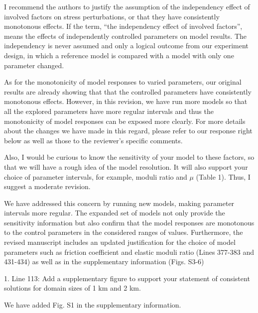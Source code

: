 \documentclass[12pt]{article}
\begin{document}
\begin{response}{I recommend the authors to justify the assumption of the independency effect of involved factors on stress perturbations, or that they have consistently monotonous effects.}
    If the term, ``the independency effect of involved factors'', means the effects of independently controlled parameters on model results. The independency is never assumed and only a logical outcome from our experiment design, in which a reference model is compared with a model with only one parameter changed. 

As for the monotonicity of model responses to varied parameters, our original results are already showing that that the controlled parameters have consistently monotonous effects. However, in this revision, we have run more models so that all the explored parameters have more regular intervals and thus the monotonicity of model responses can be exposed more clearly. For more details about the changes we have made in this regard, please refer to our response right below as well as those to the reviewer's specific comments.
\end{response}

\begin{response}{Also, I would be curious to know the sensitivity of your model to these factors, so that we will have a rough idea of the model resolution. It will also support your choice of parameter intervals, for example, moduli ratio and $\mu$ (Table 1). Thus, I suggest a moderate revision.}

    We have addressed this concern by running new models, making parameter intervals more regular. The expanded set of models not only provide the sensitivity information but also confirm that the model responses are monotonous to the control parameters in the considered ranges of values. Furthermore, the revised manuscript includes an updated justification for the choice of model parameters such as friction coefficient and elastic moduli ratio (Lines 377-383 and 431-434) as well as  in the supplementary information (Figs. S3-6) 
\end{response}



\begin{response}{1. Line 113: Add a supplementary figure to support your statement of consistent solutions for domain sizes of 1 km and 2 km.}
  
We have added Fig. S1 in the supplementary information. 
    
\end{response}
\end{document}
